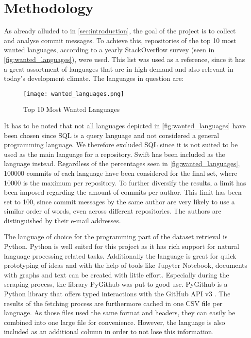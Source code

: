 \section{Methodology}
\label{sec:methodology}

As already alluded to in \autoref{sec:introduction}, the goal of the project is to
collect and analyse commit messages. To achieve this, repositories of the top 10 most
wanted languages, according to a yearly StackOverflow survey (seen in
\autoref{fig:wanted_languages}), were used. This list was used as a reference, since it
has a great assortment of languages that are in high demand and also relevant
in today's development climate. The languages in question are:

\begin{figure}[H]
  \centering
  \texttt{[image: wanted\_languages.png]}
  \caption{Top 10 Most Wanted Languages \cite{so-survey}}
  \label{fig:wanted_languages}
\end{figure}

It has to be noted that not all languages depicted in \autoref{fig:wanted_languages}
have been chosen since SQL is a query language and not considered a general
programming language. We therefore excluded SQL since
it is not suited to be used as the main language for a repository.
Swift has been included as the  language instead.
Regardless of the percentages seen in \autoref{fig:wanted_languages}, 100000 commits of each
language have been considered for the final set, where 10000 is the maximum per
repository. To further diversify the results, a limit has been imposed regarding
the amount of commits per author. This limit has been set to 100, since commit
messages by the same author are very likely to use a similar order of words,
even across different repositories. The authors are distinguished by their
e-mail addresses.

The language of choice for the programming part of the dataset retrieval
is Python. Python is well suited for this project as it has rich support for
natural language processing related tasks. Additionally the language is great
for quick prototyping of ideas and with the help of tools like Jupyter
Notebook, documents with graphs and text can be created with little effort. Especially
during the scraping process, the library PyGithub was put to good use. PyGithub
is a Python library that offers typed interactions with the GitHub API v3
\cite{pygithub}. The results of the fetching process are furthermore cached in
one CSV file per language. As those files used the same format and headers, they
can easily be combined into one large file for convenience. However, the language
is also included as an additional column in order to not lose this information.

